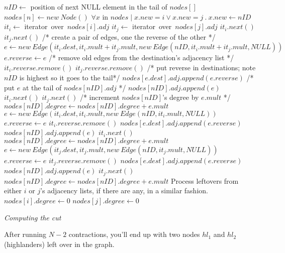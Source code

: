 \documentclass[a4paper]{article}
\begin{document}
\begin{algorithmic}
\State $nID \gets$ position of next NULL element in the tail of $nodes[]$
\State $nodes[n] \gets new\ Node()$
\State $\forall x$ in $nodes \mid x.new = i \lor x.new = j\ .\ x.new \gets nID$
\State $it_i \gets$ iterator\ over\ $nodes[i].adj$
\State $it_j \gets$ iterator\ over\ $nodes[j].adj$
		\State $it_i.next()$
		\State $it_j.next()$
		\State /* create a pair of edges, one the reverse of the other */
		\State $e \gets new\ Edge(it_i.dest, it_i.mult+it_j.mult, new\ Edge(nID, it_i.mult+it_j.mult, NULL))$
		\State $e.reverse \gets e$
		\State /* remove old edges from the destination's adjacency list */
		\State $it_i.reverse.remove()$
		\State $it_j.reverse.remove()$
		\State /* put reverse in destinations; note $nID$ is highest so it goes to the tail*/
		\State $nodes[e.dest].adj.append(e.reverse)$
		\State /* put $e$ at the tail of $nodes[nID].adj$ */
		\State $nodes[nID].adj.append(e)$
		\State $it_i.next()$
		\State $it_j.next()$
		\State /* increment $nodes[nID]$'s degree by $e.mult$ */
		\State $nodes[nID].degree \gets nodes[nID].degree + e.mult$
		\State $e \gets new\ Edge(it_i.dest, it_i.mult, new\ Edge(nID, it_i.mult, NULL))$
		\State $e.reverse \gets e$
		\State $it_i.reverse.remove()$
		\State $nodes[e.dest].adj.append(e.reverse)$
		\State $nodes[nID].adj.append(e)$
		\State $it_i.next()$
		\State $nodes[nID].degree \gets nodes[nID].degree + e.mult$
	\Else {}
		\State $e \gets new\ Edge(it_j.dest, it_j.mult, new\ Edge(nID, it_j.mult, NULL))$
		\State $e.reverse \gets e$
		\State $it_j.reverse.remove()$
		\State $nodes[e.dest].adj.append(e.reverse)$
		\State $nodes[nID].adj.append(e)$
		\State $it_j.next()$	
		\State $nodes[nID].degree \gets nodes[nID].degree + e.mult$
	\EndIf
\EndWhile
\State Process leftovers from either $i$ or $j$'s adjacency lists, if there are any, in a similar fashion.
\State $nodes[i].degree \gets 0$ 
\State $nodes[j].degree \gets 0$ 
\EndFunction
\end{algorithmic}
\hfill

\noindent
\textit{Computing the cut}

After running $N-2$ contractions, you'll end up with two nodes $hl_1$ and $hl_2$ (highlanders) left over in the graph.
\end{document}
